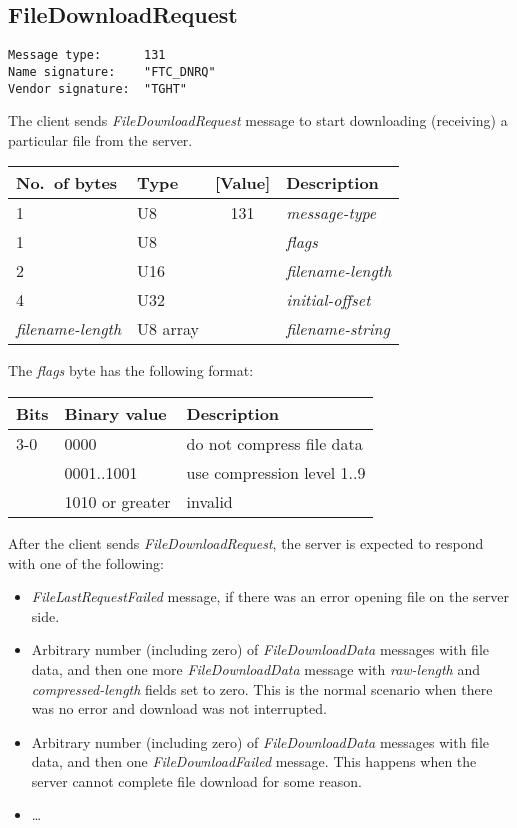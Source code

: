 \documentclass[a4paper]{article}
\newcommand{\typestr}[1]{\textit{#1}}
\begin{document}
\newpage
\subsection{FileDownloadRequest}
\begin{verbatim}
Message type:      131
Name signature:    "FTC_DNRQ"
Vendor signature:  "TGHT"
\end{verbatim}

The client sends \typestr{FileDownloadRequest} message to start
downloading (receiving) a particular file from the server.

\begin{tabular}{l|lc|l} \hline
No.\ of bytes & Type & [Value] & Description \\ \hline
1 & U8  & 131 & \typestr{message-type} \\
1 & U8  &     & \typestr{flags} \\
2 & U16 &     & \typestr{filename-length} \\
4 & U32 &     & \typestr{initial-offset} \\
\typestr{filename-length} & U8 array & & \typestr{filename-string} \\
\hline\end{tabular}

The \typestr{flags} byte has the following format:

\begin{tabular}{l|l|l}
\hline
Bits & Binary value   & Description \\ \hline
3-0 & 0000            & do not compress file data \\
    & 0001..1001      & use compression level 1..9 \\
    & 1010 or greater & invalid \\
\hline
\end{tabular}


After the client sends \typestr{FileDownloadRequest}, the server is
expected to respond with one of the following:

\begin{itemize}

\item \typestr{FileLastRequestFailed} message, if there was an error
opening file on the server side.

\item Arbitrary number (including zero) of \typestr{FileDownloadData}
messages with file data, and then one more \typestr{FileDownloadData}
message with \typestr{raw-length} and \typestr{compressed-length}
fields set to zero. This is the normal scenario when there was no
error and download was not interrupted.

\item Arbitrary number (including zero) of \typestr{FileDownloadData}
messages with file data, and then one \typestr{FileDownloadFailed}
message. This happens when the server cannot complete file download
for some reason.

\item \dots

\end{itemize}
\end{document}
